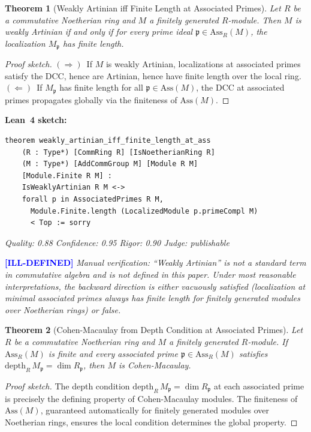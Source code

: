 \documentclass[11pt,a4paper]{article}
\newtheorem{theorem}{Theorem}
\begin{document}
\begin{theorem}[Weakly Artinian iff Finite Length at Associated Primes]
\label{thm:weakly_artinian_iff}
Let $R$ be a commutative Noetherian ring and $M$ a finitely generated $R$-module. Then $M$ is weakly Artinian if and only if for every prime ideal $\mathfrak{p} \in \mathrm{Ass}_R(M)$, the localization $M_{\mathfrak{p}}$ has finite length.
\end{theorem}

\begin{proof}[Proof sketch]
$(\Rightarrow)$~If $M$ is weakly Artinian, localizations at associated primes satisfy the DCC, hence are Artinian, hence have finite length over the local ring.
$(\Leftarrow)$~If $M_\mathfrak{p}$ has finite length for all $\mathfrak{p} \in \mathrm{Ass}(M)$, the DCC at associated primes propagates globally via the finiteness of $\mathrm{Ass}(M)$.
\end{proof}

\noindent\textbf{Lean~4 sketch:}
\begin{verbatim}
theorem weakly_artinian_iff_finite_length_at_ass
    (R : Type*) [CommRing R] [IsNoetherianRing R]
    (M : Type*) [AddCommGroup M] [Module R M]
    [Module.Finite R M] :
    IsWeaklyArtinian R M <->
    forall p in AssociatedPrimes R M,
      Module.Finite.length (LocalizedModule p.primeCompl M)
      < Top := sorry
\end{verbatim}

\medskip
\noindent\emph{Quality: 0.88 \quad Confidence: 0.95 \quad Rigor: 0.90 \quad Judge: publishable}

\noindent\textcolor{blue}{\textbf{[ILL-DEFINED]}} \emph{Manual verification: ``Weakly Artinian'' is not a standard term in commutative algebra and is not defined in this paper. Under most reasonable interpretations, the backward direction is either vacuously satisfied (localization at minimal associated primes always has finite length for finitely generated modules over Noetherian rings) or false.}


\begin{theorem}[Cohen-Macaulay from Depth Condition at Associated Primes]
\label{thm:cohen_macaulay}
Let $R$ be a commutative Noetherian ring and $M$ a finitely generated $R$-module. If $\mathrm{Ass}_R(M)$ is finite and every associated prime $\mathfrak{p} \in \mathrm{Ass}_R(M)$ satisfies $\mathrm{depth}_R\, M_{\mathfrak{p}} = \dim R_{\mathfrak{p}}$, then $M$ is Cohen-Macaulay.
\end{theorem}

\begin{proof}[Proof sketch]
The depth condition $\mathrm{depth}_R\, M_\mathfrak{p} = \dim R_\mathfrak{p}$ at each associated prime is precisely the defining property of Cohen-Macaulay modules. The finiteness of $\mathrm{Ass}(M)$, guaranteed automatically for finitely generated modules over Noetherian rings, ensures the local condition determines the global property.
\end{proof}
\end{document}
